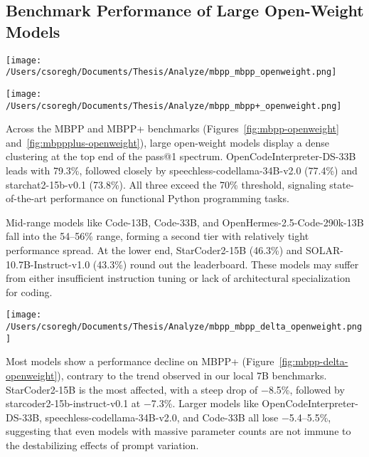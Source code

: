 \subsection{Benchmark Performance of Large Open-Weight Models}

\begin{center}
	\texttt{[image: /Users/csoregh/Documents/Thesis/Analyze/mbpp\_mbpp\_openweight.png]}
	\label{fig:mbpp-openweight}
\end{center}

\begin{center}
	\texttt{[image: /Users/csoregh/Documents/Thesis/Analyze/mbpp\_mbpp+\_openweight.png]}
	\label{fig:mbppplus-openweight}
\end{center}

Across the \gls{MBPP} and \gls{MBPP}+ benchmarks (Figures~\ref{fig:mbpp-openweight} and~\ref{fig:mbppplus-openweight}), large open-weight models display a dense clustering at the top end of the pass@1 spectrum. OpenCodeInterpreter-DS-33B leads with 79.3\%, followed closely by speechless-codellama-34B-v2.0 (77.4\%) and starchat2-15b-v0.1 (73.8\%). All three exceed the 70\% threshold, signaling state-of-the-art performance on functional Python programming tasks.

Mid-range models like Code-13B, Code-33B, and OpenHermes-2.5-Code-290k-13B fall into the 54--56\% range, forming a second tier with relatively tight performance spread. At the lower end, StarCoder2-15B (46.3\%) and SOLAR-10.7B-Instruct-v1.0 (43.3\%) round out the leaderboard. These models may suffer from either insufficient instruction tuning or lack of architectural specialization for coding.

\begin{center}
	\texttt{[image: /Users/csoregh/Documents/Thesis/Analyze/mbpp\_mbpp\_delta\_openweight.png]}
	\label{fig:mbpp-delta-openweight}
\end{center}

Most models show a performance decline on \gls{MBPP}+ (Figure~\ref{fig:mbpp-delta-openweight}), contrary to the trend observed in our local 7B benchmarks. StarCoder2-15B is the most affected, with a steep drop of −8.5\%, followed by starcoder2-15b-instruct-v0.1 at −7.3\%. Larger models like OpenCodeInterpreter-DS-33B, speechless-codellama-34B-v2.0, and Code-33B all lose −5.4--5.5\%, suggesting that even models with massive parameter counts are not immune to the destabilizing effects of prompt variation.

